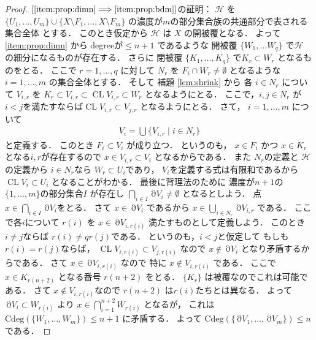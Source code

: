 \documentclass[leqno, a4paper, 12pt]{jsarticle}
\newcommand{\To}{\Longrightarrow}
\DeclareMathOperator{\bd}{\partial}
\DeclareMathOperator{\cl}{CL}
\newcommand{\yodeg}{\mathrm{Cdeg}}
\numberwithin{equation}{section}
\begin{document}
\begin{proof}
$[\ref{item:prop:dimn}\To \ref{item:prop:bdm}]$の証明：
$\mathcal{H}$
を
$\{U_{1}, \dots, U_{m}\}\cup \{X\setminus F_{1}, \dots, X\setminus F_{m}\}$
の濃度が$m$の部分集合族の共通部分で表される集合全体
とする．
このとき仮定から
$\mathcal{H}$
は
$X$
の開被覆となる．
よって
\ref{item:prop:dimn}
から
degreeが$\le n+1$
であるような
開被覆
$\{W_{1}, \dots W_{q}\}$
で$\mathcal{H}$
の細分になるものが存在する．
さらに
閉被覆
$\{K_{1}, \dots, K_{q}\}$
で$K_{r}\subset W_{r}$
となるものをとる．
ここで
$r=1, \dots, q$
に対して
$N_{r}$
を
$F_{i}\cap W_{r}\neq \emptyset$
となるような
$i=1, \dots, m$
の集合全体とする．
そして
補題
\ref{lem:shrink}
から
各
$i\in N_{r}$
について
$V_{i, r}$
を
$K_{r}\subset V_{i, r}\subset \cl V_{i, r}\subset W_{r}$
となるようにとる．
ここで，$i, j\in N_{r}$
が$i<j$を満たすならば$\cl V_{i, r}\subset V_{j, r}$
となるようにとる．
さて，
$i=1, \dots, m$
について
\begin{align}
V_{i}=\bigcup\{V_{i, r}\mid i\in N_{r}\}
\end{align}
と定義する．
このとき
$F_{i}\subset V_{i}$
が成り立つ．
というのも，
$x\in F_{i}$
かつ
$x\in K_{r}$
となる$i, r$が存在するので
$x\in V_{i, r}\subset V_{i}$
となるからである．
また
$N_{r}$の定義と
$\mathcal{H}$の定義から
$i\in N_{r}$なら
$W_{r}\subset U_{i}$であり，
$V_{i}$を定義する式は有限和であるから
$\cl V_{i}\subset U_{i}$
となることがわかる．
最後に背理法のために
濃度が$n+1$の$\{1, \dots, m\}$の部分集合$I$
が存在し
$\bigcap_{i\in I}\bd V_{i}\neq \emptyset$
となるとしよう．
点
$x\in \bigcap_{i\in I}\bd V_{i}$をとる．
さて
$x\in \bd V_{i}$
であるから
$x\in \bigcup_{i\in N_{r}}\bd V_{i, r}$
である．
ここで各$i$について
$r(i)$
を
$x\in \bd V_{i, r(i)}$
満たすものとして定義しよう．
このとき$i\ne j$ならば
$r(i)\ne qr(j)$である．
というのも，$i<j$と仮定して
もしも$r(i)=r(j)$ならば，
$\cl V_{i, r(i)}\subset V_{j, r(i)}$
なので
$x\not \in \bd V_{i}$
となり矛盾するからである．
さて
$x\in \bd V_{i, r(i)}$
なので
特に
$x\not \in V_{i, r(i)}$
である．
ここで
$x\in K_{r(n+2)}$
となる番号
$r(n+2)$
をとる．
$\{K_{r}\}$
は被覆なのでこれは可能である．
さて
$x\not \in V_{i, r(i)}$なので
$r(n+2)$
は$r(i)$たちとは異なる．
よって$\bd V_{i}\subset W_{r(i)}$
より
$x\in \bigcap_{i=1}^{n+2}W_{r(i)}$
となるが，
これは
$\yodeg(\{W_{1}, \dots, W_{m}\})\le n+1$
に矛盾する．
よって
$\yodeg(\{\bd V_{1}, \dots,  \bd V_{m}\})\le n$
である．



\end{proof}
\end{document}
